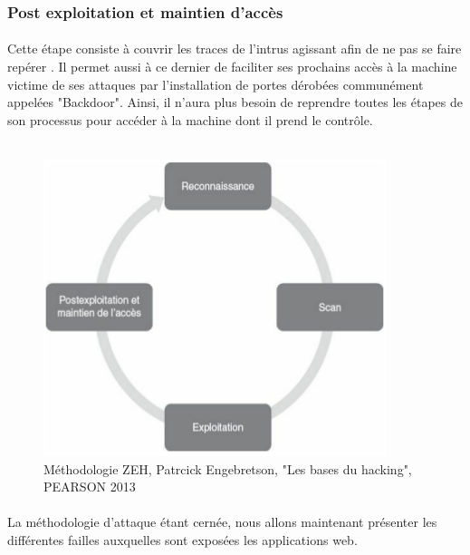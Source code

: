   \subsubsection{Post exploitation et maintien d’accès}
    \paragraph{}
      Cette étape consiste à couvrir les traces de l'intrus agissant afin de ne pas se faire repérer \cite{E}. Il permet aussi à ce dernier de faciliter ses prochains accès à la machine victime de ses attaques par l'installation de portes dérobées communément appelées "Backdoor". Ainsi, il n'aura plus besoin de reprendre toutes les étapes de son processus pour accéder à la machine dont il prend le contrôle.\\ \\
      

\begin{figure}[H]
  \begin{center}
    \includegraphics[scale=0.5]{images/zeh_cycle.png}
  \end{center}
  \caption[Représentation cyclique de la méthodologie ZEH.]
    {Méthodologie ZEH, Patrcick Engebretson, "Les bases du hacking", PEARSON 2013}
    \label{Methodologie d'intrusion}
\end{figure}


\paragraph{}
  La méthodologie d'attaque étant cernée, nous allons maintenant présenter les différentes failles auxquelles sont expos\'ees les applications web.	    
		    

